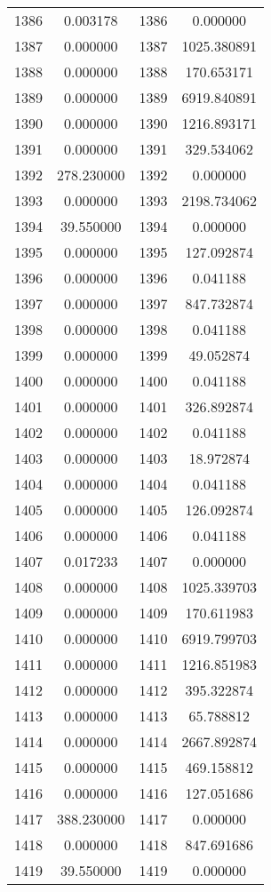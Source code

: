 \documentclass[12pt]{article}
\begin{document}
\begin{longtable}{@{}cccc@{}}
1386 & 0.003178 & 1386 & 0.000000 \\
1387 & 0.000000 & 1387 & 1025.380891 \\
1388 & 0.000000 & 1388 & 170.653171 \\
1389 & 0.000000 & 1389 & 6919.840891 \\
1390 & 0.000000 & 1390 & 1216.893171 \\
1391 & 0.000000 & 1391 & 329.534062 \\
1392 & 278.230000 & 1392 & 0.000000 \\
1393 & 0.000000 & 1393 & 2198.734062 \\
1394 & 39.550000 & 1394 & 0.000000 \\
1395 & 0.000000 & 1395 & 127.092874 \\
1396 & 0.000000 & 1396 & 0.041188 \\
1397 & 0.000000 & 1397 & 847.732874 \\
1398 & 0.000000 & 1398 & 0.041188 \\
1399 & 0.000000 & 1399 & 49.052874 \\
1400 & 0.000000 & 1400 & 0.041188 \\
1401 & 0.000000 & 1401 & 326.892874 \\
1402 & 0.000000 & 1402 & 0.041188 \\
1403 & 0.000000 & 1403 & 18.972874 \\
1404 & 0.000000 & 1404 & 0.041188 \\
1405 & 0.000000 & 1405 & 126.092874 \\
1406 & 0.000000 & 1406 & 0.041188 \\
1407 & 0.017233 & 1407 & 0.000000 \\
1408 & 0.000000 & 1408 & 1025.339703 \\
1409 & 0.000000 & 1409 & 170.611983 \\
1410 & 0.000000 & 1410 & 6919.799703 \\
1411 & 0.000000 & 1411 & 1216.851983 \\
1412 & 0.000000 & 1412 & 395.322874 \\
1413 & 0.000000 & 1413 & 65.788812 \\
1414 & 0.000000 & 1414 & 2667.892874 \\
1415 & 0.000000 & 1415 & 469.158812 \\
1416 & 0.000000 & 1416 & 127.051686 \\
1417 & 388.230000 & 1417 & 0.000000 \\
1418 & 0.000000 & 1418 & 847.691686 \\
1419 & 39.550000 & 1419 & 0.000000 \\

\end{longtable}
\end{document}
